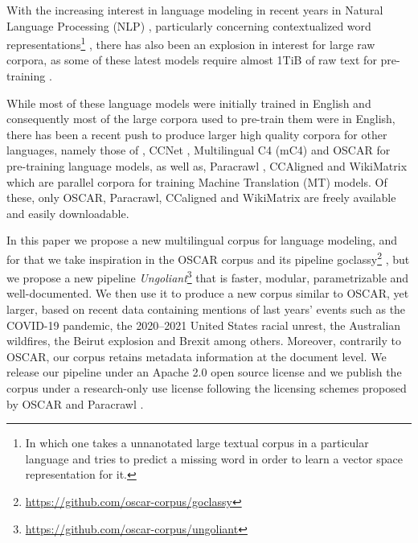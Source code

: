 With the increasing interest in language modeling in recent years in Natural Language Processing (NLP) \citep{rogers-etal-2020-primer}, particularly concerning contextualized word representations\footnote{In which one takes a unnanotated large textual corpus in a particular language and tries to predict a missing word in order to learn a vector space representation for it.} \citep{peters-etal-2018-deep,devlin-etal-2019-bert}, there has also been an explosion in interest for large raw corpora, as some of these latest models require almost 1TiB of raw text for pre-training \citep{raffel-etal-2020-exploring,brown-etal-2020-language}.

While most of these language models were initially trained in English \citep{devlin-etal-2019-bert,yang-etal-2019-xlnet,clark-etal-2020-electra,zaheer-etal-2020-big,xiong-etal-2021-nystromformer} and consequently most of the large corpora used to pre-train them were in English, there has been a recent push to produce larger high quality corpora for other languages, namely those of \citet{grave-etal-2018-learning}, CCNet \citep{wenzek-etal-2020-ccnet}, Multilingual C4 (mC4) \citep{xue-etal-2021-mt5} and OSCAR \citep{ortiz-suarez-etal-2019-asynchronous,ortiz-suarez-etal-2020-monolingual} for pre-training language models, as well as, Paracrawl \citep{espla-etal-2019-paracrawl,banon-etal-2020-paracrawl}, CCAligned \citep{el-kishky-etal-2020-ccaligned} and WikiMatrix \citep{schwenk-etal-2021-wikimatrix} which are parallel corpora for training Machine Translation (MT) models. Of these, only OSCAR, Paracrawl, CCaligned and WikiMatrix are freely available and easily downloadable.

In this paper we propose a new multilingual corpus for language modeling, and for that we take inspiration in the OSCAR corpus and its pipeline goclassy\footnote{\url{https://github.com/oscar-corpus/goclassy}} \citep{ortiz-suarez-etal-2019-asynchronous,ortiz-suarez-etal-2020-monolingual}, but we propose a new pipeline \emph{Ungoliant}\footnote{\url{https://github.com/oscar-corpus/ungoliant}} that is faster, modular, parametrizable and well-documented. We then use it to produce a new corpus similar to OSCAR, yet larger, based on recent data containing mentions of last years' events such as the COVID-19 pandemic, the 2020–2021 United States racial unrest, the Australian wildfires, the Beirut explosion and Brexit among others. Moreover, contrarily to OSCAR, our corpus retains metadata information at the document level. We release our pipeline under an Apache 2.0 open source license and we publish the corpus under a research-only use license following the licensing schemes proposed by OSCAR \citep{ortiz-suarez-etal-2019-asynchronous,ortiz-suarez-etal-2020-monolingual} and Paracrawl \citep{espla-etal-2019-paracrawl,banon-etal-2020-paracrawl}.


